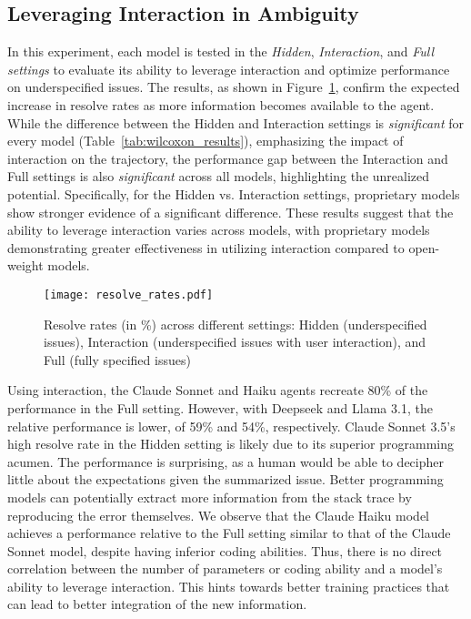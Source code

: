 \subsection{Leveraging Interaction in Ambiguity}
In this experiment, each model is tested in the \textit{Hidden}, \textit{Interaction}, and \textit{Full settings} to evaluate its ability to leverage interaction and optimize performance on underspecified issues. The results, as shown in Figure~\ref{fig:resolve_rates}, confirm the expected increase in resolve rates as more information becomes available to the agent. While the difference between the Hidden and Interaction settings is \textit{significant} for every model (Table~\ref{tab:wilcoxon_results}), emphasizing the impact of interaction on the trajectory, the performance gap between the Interaction and Full settings is also \textit{significant} across all models, highlighting the unrealized potential. Specifically, for the Hidden vs. Interaction settings, proprietary models show stronger evidence of a significant difference. These results suggest that the ability to leverage interaction varies across models, with proprietary models demonstrating greater effectiveness in utilizing interaction compared to open-weight models.
\begin{figure}[h!]
	\centering
	\texttt{[image: resolve\_rates.pdf]}
	\caption{Resolve rates (in \%) across different settings: Hidden (underspecified issues), Interaction (underspecified issues with user interaction), and Full (fully specified issues)}
    \vspace{-12pt}
	\label{fig:resolve_rates}
\end{figure}


Using interaction, the Claude Sonnet and Haiku agents recreate 80\% of the performance in the Full setting. However, with Deepseek and Llama 3.1, the relative performance is lower, of 59\% and 54\%, respectively. Claude Sonnet 3.5's high resolve rate in the Hidden setting is likely due to its superior programming acumen. The performance is surprising, as a human would be able to decipher little about the expectations given the summarized issue. Better programming models can potentially extract more information from the stack trace by reproducing the error themselves. We observe that the Claude Haiku model achieves a performance relative to the Full setting similar to that of the Claude Sonnet model, despite having inferior coding abilities. Thus, there is no direct correlation between the number of parameters or coding ability and a model's ability to leverage interaction. This hints towards better training practices that can lead to better integration of the new information.

